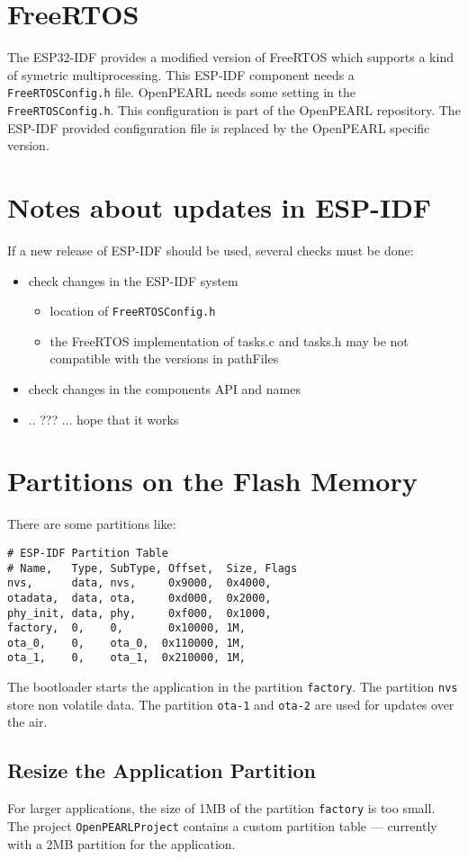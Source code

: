 \section{FreeRTOS}
The ESP32-IDF provides a modified version of FreeRTOS which supports a kind of 
symetric multiprocessing.
This ESP-IDF component needs a \verb|FreeRTOSConfig.h| file.
OpenPEARL needs some setting in the \verb|FreeRTOSConfig.h|. 
This configuration is part of the OpenPEARL repository. The ESP-IDF provided
configuration file is replaced by the OpenPEARL specific version.

\section{Notes about updates in ESP-IDF}
If a new release of ESP-IDF should be used, several checks must be done:
\begin{itemize}
\item check changes in the ESP-IDF system
  \begin{itemize}
    \item location of  \verb|FreeRTOSConfig.h|
    \item  the FreeRTOS implementation of tasks.c and tasks.h may be 
       not compatible with the versions in pathFiles
  \end{itemize}
\item check changes in the components API and names
\item .. ??? ... hope that it works
\end{itemize}

\section{Partitions on the Flash Memory}
There are some partitions like:

\begin{verbatim}
# ESP-IDF Partition Table
# Name,   Type, SubType, Offset,  Size, Flags
nvs,      data, nvs,     0x9000,  0x4000,
otadata,  data, ota,     0xd000,  0x2000,
phy_init, data, phy,     0xf000,  0x1000,
factory,  0,    0,       0x10000, 1M,
ota_0,    0,    ota_0,  0x110000, 1M,
ota_1,    0,    ota_1,  0x210000, 1M,
\end{verbatim}
The bootloader starts the application in the partition \texttt{factory}.
The partition \texttt{nvs} store non volatile data.
The partition \texttt{ota-1} and \texttt{ota-2} are used for updates over the air.

\subsection{Resize the Application Partition}
For larger applications, the size of 1MB of the partition \texttt{factory} is too small.
The project \texttt{OpenPEARLProject} contains a custom 
partition table --- currently with a 2MB partition for the application.

